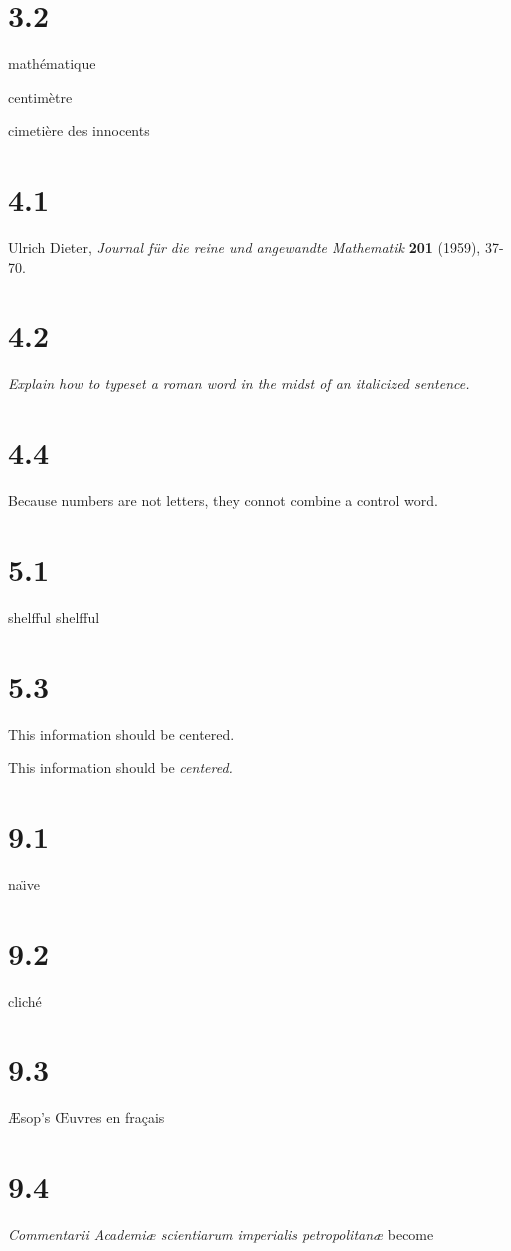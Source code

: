 \documentclass{article}
\begin{document}
\section*{3.2}
math\'ematique

centim\`etre

cimeti\`ere des innocents

\section*{4.1}
Ulrich Dieter, {\sl Journal f\"ur die reine und angewandte Mathematik} {\bf 201} (1959),
37-70. 

\section*{4.2}
{\it Explain how to typeset a {\rm roman} word in the midst of an italicized sentence.}

\section*{4.4}
Because numbers are not letters, they connot combine a control word.

\section*{5.1}
shelfful
shel{}f{f}ul


\section*{5.3}
\centerline{This information should be {centered}.}
\centerline{This information should be \it centered.}

\section*{9.1}
na\"\i ve

\section*{9.2}
clich\'e

\section*{9.3}
\AE sop's \OE uvres en fra\c cais

\section*{9.4}
{\sl Commentarii Academi\ae{} scientiarum imperialis petropolitan\ae{}} become
\end{document}
